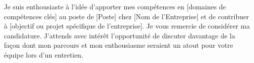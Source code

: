 
Je suis enthousiaste à l'idée d'apporter mes compétences en [domaines de compétences clés] au poste de [Poste] chez [Nom de l'Entreprise] et de contribuer à [objectif ou projet spécifique de l'entreprise]. Je vous remercie de considérer ma candidature. J'attends avec intérêt l'opportunité de discuter davantage de la façon dont mon parcours et mon enthousiasme seraient un atout pour votre équipe lors d'un entretien.
